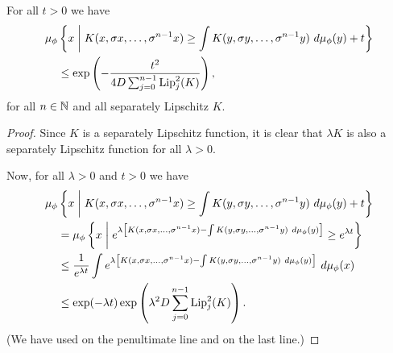 \begin{corollary}\label{cor:cm-3-1}
	For all $t > 0$ we have
	\begin{align}\label{fml:cm-4}
		\mu_\phi&\left\{x \midmid K(x, \sigma{x}, \dots, \sigma^{n - 1}{x}) \geq \int{K(y, \sigma{y}, \dots, \sigma^{n - 1}{y})\ d\mu_\phi(y)} + t\right\} \nonumber \\
			&\leq \exp\left(-\frac{t^2}{4D\sum_{j = 0}^{n - 1}{\Lip_j^2(K)}}\right),
	\end{align}
	for all $n \in \mathbb{N}$ and all separately Lipschitz $K$.
	\begin{proof}
		Since $K$ is a separately Lipschitz function, it is clear that $\lambda K$ is also a separately Lipschitz function for all $\lambda > 0$.
		
		Now, for all $\lambda > 0$ and $t > 0$ we have
		\begin{align}
			\mu_\phi&\left\{x \midmid K(x, \sigma{x}, \dots, \sigma^{n - 1}{x}) \geq \int{K(y, \sigma{y}, \dots, \sigma^{n - 1}{y})\ d\mu_\phi(y)} + t\right\} \nonumber \\
				&= \mu_\phi\left\{x \midmid e^{\lambda\left[K(x, \sigma{x}, \dots, \sigma^{n - 1}{x}) - \int{K(y, \sigma{y}, \dots, \sigma^{n - 1}{y})\ d\mu_\phi(y)}\right]} \geq e^{\lambda t}\right\} \nonumber \\
				&\leq \frac{1}{e^{\lambda t}} \int{e^{\lambda\left[K(x, \sigma{x}, \dots, \sigma^{n - 1}{x}) - \int{K(y, \sigma{y}, \dots, \sigma^{n - 1}{y})\ d\mu_\phi(y)}\right]}\ d\mu_\phi(x)} \nonumber \\
				& \leq \exp(-\lambda t) \exp\left(\lambda^2 D \sum_{j = 0}^{n - 1}{\Lip_j^2(K)}\right). \label{fml:cor-3-1-exp}
		\end{align}
		(We have used  on the penultimate line and  on the last line.)
		

\end{proof}
\end{corollary}
